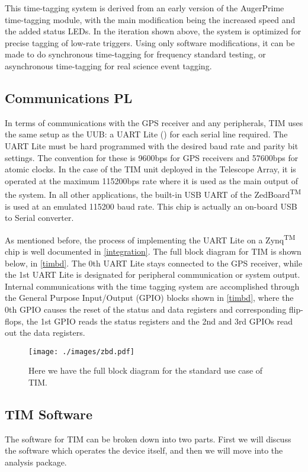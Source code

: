 This time-tagging system is derived from an early version of the AugerPrime time-tagging module, with the main modification being the increased speed and the added status LEDs. In the iteration shown above, the system is optimized for precise tagging of low-rate triggers. Using only software modifications, it can be made to do synchronous time-tagging for frequency standard testing, or asynchronous time-tagging for real science event tagging. 
\subsection{Communications PL}
In terms of communications with the GPS receiver and any peripherals, TIM uses the same setup as the UUB: a UART Lite (\cite{lite}) for each serial line required. The UART Lite must be hard programmed with the desired baud rate and parity bit settings. The convention for these is 9600bps for GPS receivers and 57600bps for atomic clocks. In the case of the TIM unit deployed in the Telescope Array, it is operated at the maximum 115200bps rate where it is used as the main output of the system. In all other applications, the built-in USB UART of the ZedBoard\textsuperscript{TM} is used at an emulated 115200 baud rate. This chip is actually an on-board USB to Serial converter. 

As mentioned before, the process of implementing the UART Lite on a Zynq\textsuperscript{TM} chip is well documented in \autoref{integration}. The full block diagram for TIM is shown below, in \autoref{timbd}. The 0th UART Lite stays connected to the GPS receiver, while the 1st UART Lite is designated for peripheral communication or system output. Internal communications with the time tagging system are accomplished through the General Purpose Input/Output (GPIO) blocks shown in \autoref{timbd}, where the 0th GPIO causes the reset of the status and data registers and corresponding flip-flops, the 1st GPIO reads the status registers and the 2nd and 3rd GPIOs read out the data registers.

\begin{figure}[H]
\centering
\texttt{[image: ./images/zbd.pdf]}
\caption[TIM PL Block Diagram]{Here we have the full block diagram for the standard use case of TIM.}
\label{timbd}
\end{figure}

\subsection{TIM Software}
The software for TIM can be broken down into two parts. First we will discuss the software which operates the device itself, and then we will move into the analysis package. 
